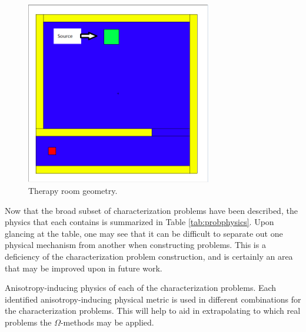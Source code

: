 \begin{figure}[h!]
  \centering
  \includegraphics[height=8cm]{./chapters/characterization_probs/figures/geometries/therapy-room.png}
  \caption[Nuclear medicine therapy room.]{Therapy room geometry.}
  \label{fig:therapygeom}
\end{figure}

Now that the broad subset of characterization problems have been described,
the physics that each contains is summarized in Table \ref{tab:probphysics}.
Upon glancing at the table, one may see that it can be difficult to separate
out one physical mechanism from another when constructing problems. This is a
deficiency of the characterization problem construction, and is certainly an
area that may be improved upon in future work.

\begin{table}[h!]
  \centering
  
  \caption[Anisotropy-inducing physics of each of the characterization problems.]
  {Anisotropy-inducing physics of each of the characterization problems.
  Each identified anisotropy-inducing physical metric is used in different
  combinations for the characterization problems. This will help to aid in
  extrapolating to which real problems the $\Omega$-methods may be applied.}
  \label{tab:probphysics}
\end{table}
